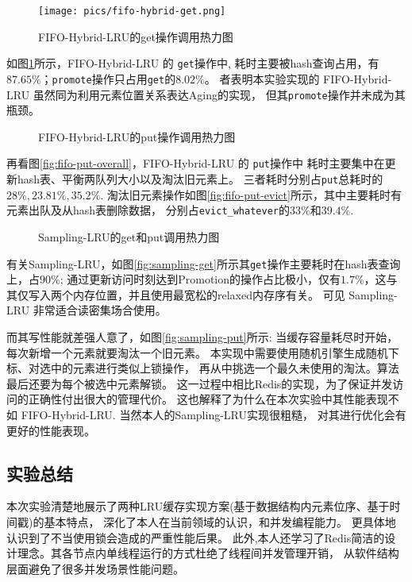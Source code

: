 \begin{figure}
    \centering
    \texttt{[image: pics/fifo-hybrid-get.png]}
    \caption{FIFO-Hybrid-LRU的get操作调用热力图}
    \label{fig:fifo-get}
\end{figure}

如图\ref{fig:fifo-get}所示，FIFO-Hybrid-LRU 的 \verb|get|操作中,
耗时主要被hash查询占用，有$87.65\%$；\verb|promote|操作只占用\verb|get|的$8.02\%$。
者表明本实验实现的 FIFO-Hybrid-LRU 虽然同为利用元素位置关系表达Aging的实现，
但其\verb|promote|操作并未成为其瓶颈。

\begin{figure}
    \centering
    \caption{FIFO-Hybrid-LRU的put操作调用热力图}
    \label{fig:fifo-put}
\end{figure}

再看图\ref{fig:fifo-put-overall}，FIFO-Hybrid-LRU 的 \verb|put|操作中
耗时主要集中在更新hash表、平衡两队列大小以及淘汰旧元素上。
三者耗时分别占\verb|put|总耗时的 $28\%, 23.81\%, 35.2\%$. 
淘汰旧元素操作如图\ref{fig:fifo-put-evict}所示，其中主要耗时有元素出队及从hash表删除数据，
分别占\verb|evict_whatever|的$33\%$和$39.4\%$.

\begin{figure}
    \centering
    \caption{Sampling-LRU的get和put调用热力图}
    \label{fig:sampling-get-put}
\end{figure}

有关Sampling-LRU，如图\ref{fig:sampling-get}所示其\verb|get|操作主要耗时在hash表查询上，占$90\%$;
通过更新访问时刻达到Promotion的操作占比极小，仅有$1.7\%$，这与其仅写入两个内存位置，并且使用最宽松的relaxed内存序有关。
可见 Sampling-LRU 非常适合读密集场合使用。

而其写性能就差强人意了，如图\ref{fig:sampling-put}所示:
当缓存容量耗尽时开始，每次新增一个元素就要淘汰一个旧元素。
本实现中需要使用随机引擎生成随机下标、对选中的元素进行类似上锁操作，
再从中挑选一个最久未使用的淘汰。算法最后还要为每个被选中元素解锁。
这一过程中相比Redis的实现，为了保证并发访问的正确性付出很大的管理代价。
这也解释了为什么在本次实验中其性能表现不如 FIFO-Hybrid-LRU.
当然本人的Sampling-LRU实现很粗糙，
对其进行优化会有更好的性能表现。

\subsection{实验总结}

本次实验清楚地展示了两种LRU缓存实现方案(基于数据结构内元素位序、基于时间戳)的基本特点，
深化了本人在当前领域的认识，和并发编程能力。
更具体地认识到了不当使用锁会造成的严重性能后果。
此外,本人还学习了Redis简洁的设计理念。其各节点内单线程运行的方式杜绝了线程间并发管理开销，
从软件结构层面避免了很多并发场景性能问题。

